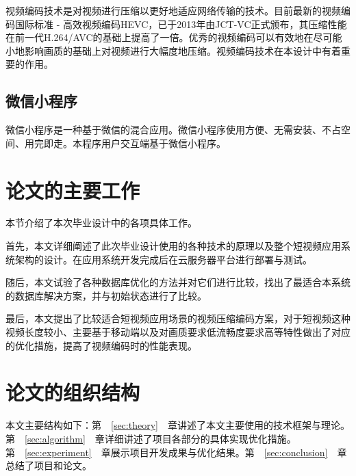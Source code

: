 视频编码技术是对视频进行压缩以更好地适应网络传输的技术。目前最新的视频编码国际标准 - 高效视频编码HEVC，已于2013年由JCT-VC正式颁布，其压缩性能在前一代H.264/AVC的基础上提高了一倍。优秀的视频编码可以有效地在尽可能小地影响画质的基础上对视频进行大幅度地压缩\cite{万帅2014新一代高效视频编码}。视频编码技术在本设计中有着重要的作用。

\subsection{微信小程序}
微信小程序是一种基于微信的混合应用。微信小程序使用方便、无需安装、不占空间、用完即走。本程序用户交互端基于微信小程序。

\section{论文的主要工作}

本节介绍了本次毕业设计中的各项具体工作。

首先，本文详细阐述了此次毕业设计使用的各种技术的原理以及整个短视频应用系统架构的设计。在应用系统开发完成后在云服务器平台进行部署与测试。

随后，本文试验了各种数据库优化的方法并对它们进行比较，找出了最适合本系统的数据库解决方案，并与初始状态进行了比较。

最后，本文提出了比较适合短视频应用场景的视频压缩编码方案，对于短视频这种视频长度较小、主要基于移动端以及对画质要求低流畅度要求高等特性做出了对应的优化措施，提高了视频编码时的性能表现。




\section{论文的组织结构}

本文主要结构如下：第~~\ref{sec:theory}~~章讲述了本文主要使用的技术框架与理论。第~~\ref{sec:algorithm}~~章详细讲述了项目各部分的具体实现优化措施。第~~\ref{sec:experiment}~~章展示项目开发成果与优化结果。第~~\ref{sec:conclusion}~~章总结了项目和论文。
